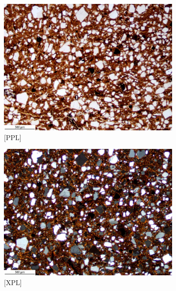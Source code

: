 \documentclass[a4paper]{article}
\begin{document}
\begin{figure}[H]
	\centering
	\begin{subfigure}[t]{.49\textwidth}
		\includegraphics[width=\textwidth]{ThinSections/96-2_4x_PPL.jpg}
		\caption{[PPL]}
	\end{subfigure}\hspace{.5em}\hfill
	\begin{subfigure}[t]{.49\textwidth}
		\includegraphics[width=\textwidth]{ThinSections/96-2_4x_XPL.jpg}
		\caption{[XPL]}
	\end{subfigure}
	\begin{subfigure}[t]{.32\textwidth}

\end{subfigure}
\end{figure}
\end{document}
